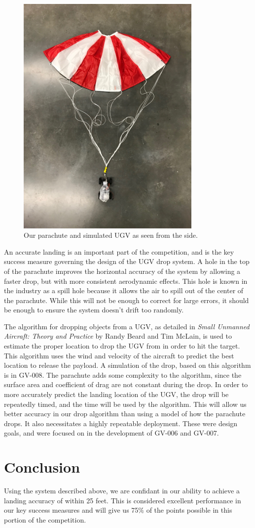 \documentclass[]{auvsi_doc}
\begin{document}
\begin{figure}[h]
\centering
\includegraphics[width=90mm]{./figs/Parachute_Side.jpg}
\caption{Our parachute and simulated UGV as seen from the side.}
\label{fig:side}
\end{figure}

An accurate landing is an important part of the competition, and is the key success measure governing the design of the UGV drop system.
A hole in the top of the parachute improves the horizontal accuracy of the system by allowing a faster drop, but with more consistent aerodynamic effects.
This hole is known in the industry as a spill hole because it allows the air to spill out of the center of the parachute. 
 While this will not be enough to correct for large errors, it should be enough to ensure the system doesn't drift  too randomly. 
 
 The algorithm for dropping objects from a UGV, as detailed in \textit{Small Unmanned Aircraft: Theory and Practice} by Randy Beard and Tim McLain, is used to estimate the proper location to drop the UGV from in order to hit the target. This algorithm uses the wind and velocity of the aircraft to predict the best location to release the payload. A simulation of the drop, based on this algorithm is in GV-008. 
 The parachute adds some complexity to the algorithm, since the surface area and coefficient of drag are not constant during the drop. In order to more accurately predict the landing location of the UGV, the drop will be repeatedly timed, and the time will be used by the algorithm. This will allow us better accuracy in our drop algorithm than using a model of how the parachute drops. It also necessitates a highly repeatable deployment. These were design goals, and were focused on in the development of GV-006 and GV-007.


\section{Conclusion}
Using the system described above, we are confidant in our ability to achieve a landing accuracy of within 25 feet. This is considered excellent performance in our key success measures and will give us 75\% of the points possible in this portion of the competition. 
\end{document}
